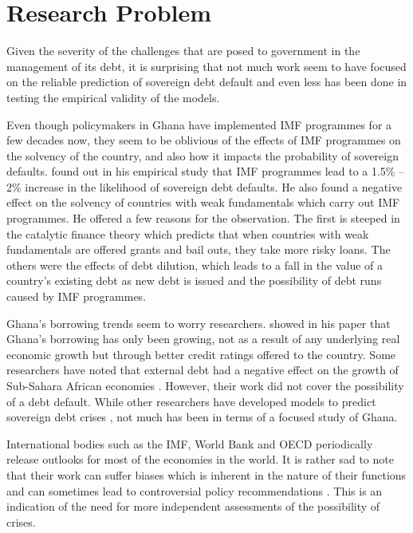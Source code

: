 \documentclass[a4paper, 12pt]{article}
\begin{document}
	
	\section{Research Problem}
	Given the severity of the challenges that are posed to government in the management of its debt, it is surprising that not much work seem to have focused on the reliable prediction of sovereign debt default  and even less has been done in testing the empirical validity of the models. 
	
	
	Even though policymakers in Ghana have implemented IMF programmes for a few decades now, they seem to be oblivious of the effects of IMF programmes on the solvency of the country, and also how it impacts the probability of sovereign defaults.  found out in his empirical study that IMF programmes lead to a 1.5\% -- 2\% increase in the likelihood of sovereign debt defaults. He also found a negative effect on the solvency of countries with weak fundamentals which carry out IMF programmes. He offered a few reasons for the observation. The first is steeped in the catalytic finance theory which predicts that when countries with weak fundamentals are offered grants and bail outs, they take more risky loans.  The others were the effects of debt dilution, which leads to a fall in the value of a country's existing debt as new debt is issued and the possibility of debt runs caused by IMF programmes.
	
	Ghana's borrowing trends seem to worry researchers.  showed in his paper that Ghana's borrowing has only been growing, not as a result of any underlying real economic growth but through better credit ratings offered to the country. Some researchers have noted that external debt had a negative effect on the growth of Sub-Sahara African economies \cite{Fiagbe2015, Shittu2018}. However, their work did not cover the possibility of a debt default. While other researchers have developed models to predict sovereign debt crises \cite{Marc-2008}, not much has been in terms of a focused study of Ghana.
	
	International bodies such as the IMF, World Bank and OECD periodically release outlooks for most of the economies in the world. It is rather sad to note that their work can suffer biases which is inherent in the nature of their functions \cite{Batchelor2001} and can sometimes lead to controversial policy recommendations \cite{nersisyan2010does}. This is an indication of the need for more independent assessments of the possibility of crises.
	
\end{document}
